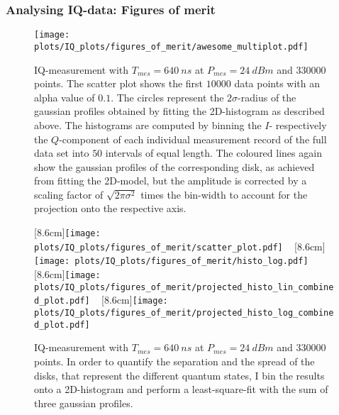 \FloatBarrier
\subsubsection{Analysing IQ-data: Figures of merit}




\begin{figure}
\centering
{\texttt{[image: plots/IQ\_plots/figures\_of\_merit/awesome\_multiplot.pdf]}}
\caption{
IQ-measurement with $T_{mes} = \SI{640}{ns}$ at $P_{mes} = \SI{24}{dBm}$ and $330000$ points. The scatter plot shows the first $10000$ data points with an alpha value of $0.1$. The circles represent the $2\sigma$-radius of the gaussian profiles obtained by fitting the 2D-histogram as described above. The histograms are computed by binning the $I$- respectively the $Q$-component of each individual measurement record of the full data set into $50$ intervals of equal length. The coloured lines again show the gaussian profiles of the corresponding disk, as achieved from fitting the 2D-model, but the amplitude is corrected by a scaling factor of $\sqrt{2 \pi \sigma^2}$ times the bin-width to account for the projection onto the respective axis.
}
\label{fig:IQ:figures_of_merit:awesome_multiplot}
\end{figure}









\begin{figure}
\centering
{}
[8.6cm]{\texttt{[image: plots/IQ\_plots/figures\_of\_merit/scatter\_plot.pdf]}}
~
[8.6cm]{\texttt{[image: plots/IQ\_plots/figures\_of\_merit/histo\_log.pdf]}}
~
[8.6cm]{\texttt{[image: plots/IQ\_plots/figures\_of\_merit/projected\_histo\_lin\_combined\_plot.pdf]}}
~
[8.6cm]{\texttt{[image: plots/IQ\_plots/figures\_of\_merit/projected\_histo\_log\_combined\_plot.pdf]}}
\caption{
IQ-measurement with $T_{mes} = \SI{640}{ns}$ at $P_{mes} = \SI{24}{dBm}$ and $330000$ points. In order to quantify the separation and the spread of the disks, that represent the different quantum states, I bin the results onto a 2D-histogram and perform a least-square-fit with the sum of three gaussian profiles.
}
\label{fig:IQ:figures_of_merit:main}
\end{figure}







